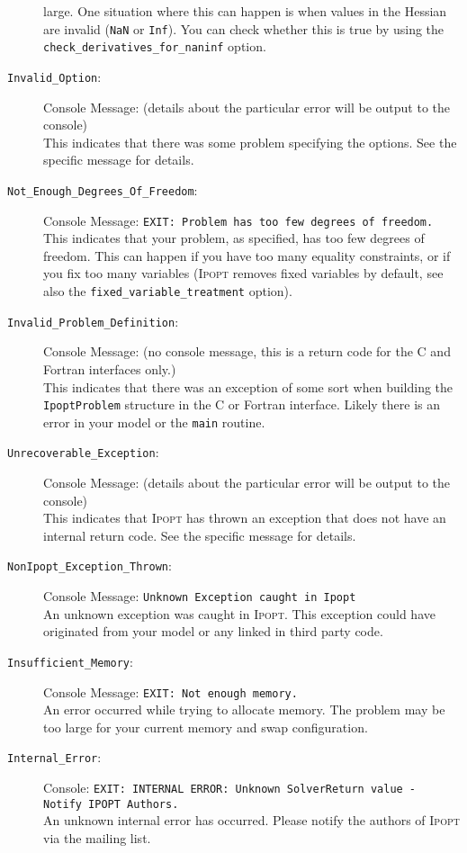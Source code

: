 \documentclass[10pt]{article}
\newcommand{\Ipopt}{\textsc{Ipopt}\xspace}
\begin{document}
\begin{description}
  large.  One situation where this can happen is when values in the
  Hessian are invalid ({\tt NaN} or {\tt Inf}).  You can check whether this
  is true by using the {\tt check\_derivatives\_for\_naninf} option.
\item[{\tt Invalid\_Option}:]  $\;$ \\
  Console Message: (details about the particular error
  will be output to the console) \\
  This indicates that there was some problem specifying the options.
  See the specific message for details.
\item[{\tt Not\_Enough\_Degrees\_Of\_Freedom}:]  $\;$ \\
  Console Message: {\tt EXIT: Problem has too few degrees of freedom.} \\
  This indicates that your problem, as specified, has too few degrees
  of freedom. This can happen if you have too many equality
  constraints, or if you fix too many variables (\Ipopt removes fixed
  variables by default, see also the {\tt fixed\_variable\_treatment} option).
\item[{\tt Invalid\_Problem\_Definition}:]  $\;$ \\
  Console Message: (no console message, this is a return code for the
  C and Fortran interfaces only.) \\
  This indicates that there was an exception of some sort when
  building the {\tt IpoptProblem} structure in the C or Fortran
  interface. Likely there is an error in your model or the {\tt main}
  routine.
\item[{\tt Unrecoverable\_Exception}:]  $\;$ \\
  Console Message: (details about the particular error
  will be output to the console) \\
  This indicates that \Ipopt has thrown an exception that does not
  have an internal return code. See the specific message for details.
\item[{\tt NonIpopt\_Exception\_Thrown}:]  $\;$ \\
  Console Message: {\tt Unknown Exception caught in Ipopt} \\
  An unknown exception was caught in \Ipopt. This exception could have
  originated from your model or any linked in third party code.
\item[{\tt Insufficient\_Memory}:]  $\;$ \\
  Console Message: {\tt EXIT: Not enough memory.} \\
  An error occurred while trying to allocate memory. The problem may
  be too large for your current memory and swap configuration.
\item[{\tt Internal\_Error}:]  $\;$ \\
  Console: {\tt EXIT: INTERNAL ERROR: Unknown SolverReturn
    value - Notify IPOPT Authors.} \\
  An unknown internal error has occurred. Please notify the authors of
  \Ipopt via the mailing list.

\end{description}
\end{document}
